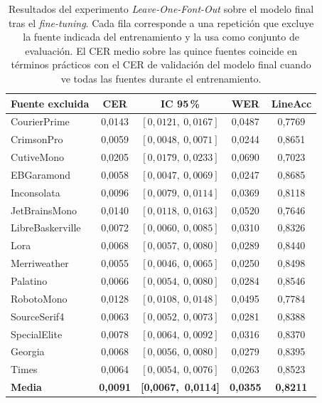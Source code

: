 \begin{table}[!htbp]
	\centering
	\caption{Resultados del experimento \textit{Leave-One-Font-Out} sobre el modelo final tras el \textit{fine-tuning}. Cada fila corresponde a una repetición que excluye la fuente indicada del entrenamiento y la usa como conjunto de evaluación. El CER medio sobre las quince fuentes coincide en términos prácticos con el CER de validación del modelo final cuando ve todas las fuentes durante el entrenamiento.}
	\label{tab:lofo-post-ft}
	\small
	\begin{tabular}{lcccc}
		\toprule
		\textbf{Fuente excluida} & \textbf{CER} & \textbf{IC 95\,\%} & \textbf{WER} & \textbf{LineAcc} \\
		\midrule
		CourierPrime          & 0,0143 & $[0{,}0121,\ 0{,}0167]$ & 0,0487 & 0,7769 \\
		CrimsonPro            & 0,0059 & $[0{,}0048,\ 0{,}0071]$ & 0,0244 & 0,8651 \\
		CutiveMono            & 0,0205 & $[0{,}0179,\ 0{,}0233]$ & 0,0690 & 0,7023 \\
		EBGaramond            & 0,0058 & $[0{,}0047,\ 0{,}0069]$ & 0,0247 & 0,8685 \\
		Inconsolata           & 0,0096 & $[0{,}0079,\ 0{,}0114]$ & 0,0369 & 0,8118 \\
		JetBrainsMono         & 0,0140 & $[0{,}0118,\ 0{,}0163]$ & 0,0520 & 0,7646 \\
		LibreBaskerville      & 0,0072 & $[0{,}0060,\ 0{,}0085]$ & 0,0310 & 0,8326 \\
		Lora                  & 0,0068 & $[0{,}0057,\ 0{,}0080]$ & 0,0289 & 0,8440 \\
		Merriweather          & 0,0055 & $[0{,}0046,\ 0{,}0065]$ & 0,0250 & 0,8498 \\
		Palatino              & 0,0066 & $[0{,}0054,\ 0{,}0080]$ & 0,0284 & 0,8546 \\
		RobotoMono            & 0,0128 & $[0{,}0108,\ 0{,}0148]$ & 0,0495 & 0,7784 \\
		SourceSerif4          & 0,0063 & $[0{,}0052,\ 0{,}0073]$ & 0,0281 & 0,8388 \\
		SpecialElite          & 0,0078 & $[0{,}0064,\ 0{,}0092]$ & 0,0316 & 0,8370 \\
		Georgia               & 0,0068 & $[0{,}0056,\ 0{,}0080]$ & 0,0279 & 0,8395 \\
		Times                 & 0,0064 & $[0{,}0054,\ 0{,}0076]$ & 0,0263 & 0,8523 \\
		\midrule
		\textbf{Media}        & \textbf{0,0091} & \textbf{[0{,}0067,\ 0{,}0114]} & \textbf{0,0355} & \textbf{0,8211} \\
		\bottomrule
	\end{tabular}
\end{table}

